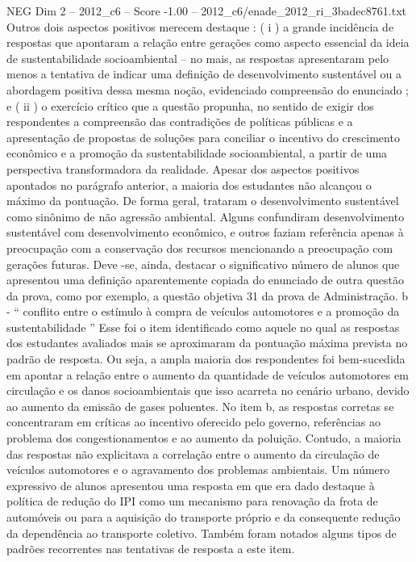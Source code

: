 \begin{textsample}{NEG Dim 2 – 2012\_c6 – Score -1.00 – 2012\_c6/enade\_2012\_ri\_3badec8761.txt}
Outros dois aspectos positivos merecem destaque : ( i ) a grande incidência de respostas que apontaram a relação entre gerações como aspecto essencial da ideia de sustentabilidade socioambiental – no mais, as respostas apresentaram pelo menos a tentativa de indicar uma definição de desenvolvimento sustentável ou a abordagem positiva dessa mesma noção, evidenciado compreensão do enunciado ; e ( ii ) o exercício crítico que a questão propunha, no sentido de exigir dos respondentes a compreensão das contradições de políticas públicas e a apresentação de propostas de soluções para conciliar o incentivo do crescimento econômico e a promoção da sustentabilidade socioambiental, a partir de uma perspectiva transformadora da realidade.
Apesar dos aspectos positivos apontados no parágrafo anterior, a maioria dos estudantes não alcançou o máximo da pontuação.
De forma geral, trataram o desenvolvimento sustentável como sinônimo de não agressão ambiental.
Alguns confundiram desenvolvimento sustentável com desenvolvimento econômico, e outros faziam referência apenas à preocupação com a conservação dos recursos mencionando a preocupação com gerações futuras.
Deve -se, ainda, destacar o significativo número de alunos que apresentou uma definição aparentemente copiada do enunciado de outra questão da prova, como por exemplo, a questão objetiva 31 da prova de Administração. b - “ conflito entre o estímulo à compra de veículos automotores e a promoção da sustentabilidade ” Esse foi o item identificado como aquele no qual as respostas dos estudantes avaliados mais se aproximaram da pontuação máxima prevista no padrão de resposta.
Ou seja, a ampla maioria dos respondentes foi bem-sucedida em apontar a relação entre o aumento da quantidade de veículos automotores em circulação e os danos socioambientais que isso acarreta no cenário urbano, devido ao aumento da emissão de gases poluentes.
No item b, as respostas corretas se concentraram em críticas ao incentivo oferecido pelo governo, referências ao problema dos congestionamentos e ao aumento da poluição.
Contudo, a maioria das respostas não explicitava a correlação entre o aumento da circulação de veículos automotores e o agravamento dos problemas ambientais.
Um número expressivo de alunos apresentou uma resposta em que era dado destaque à política de redução do IPI como um mecanismo para renovação da frota de automóveis ou para a aquisição do transporte próprio e da consequente redução da dependência ao transporte coletivo.
Também foram notados alguns tipos de padrões recorrentes nas tentativas de resposta a este item.

\end{textsample}

